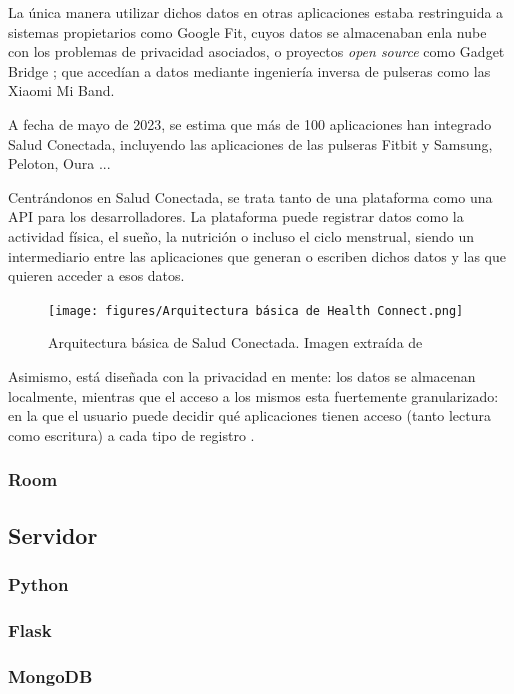             La única manera utilizar dichos datos 
            en otras aplicaciones estaba restringuida a sistemas propietarios como Google Fit, cuyos datos se 
            almacenaban enla nube con los problemas de privacidad asociados, o proyectos \textit{open source} como 
            Gadget Bridge \cite{freeyourgadget_gadgetbridge_nodate}; que accedían a datos mediante ingeniería inversa 
            de pulseras como las Xiaomi Mi Band. \newline

            A fecha de mayo de 2023, se estima que más de 100 aplicaciones han integrado Salud Conectada, incluyendo
            las aplicaciones de las pulseras Fitbit y Samsung, Peloton, Oura \cite{malik_googles_2023}... \newline

            Centrándonos en Salud Conectada, se trata tanto de una plataforma como una API para los desarrolladores.
            La plataforma puede registrar datos como la actividad física, el sueño, la nutrición o incluso el ciclo
            menstrual, siendo un intermediario entre las aplicaciones que generan o escriben dichos datos y las 
            que quieren acceder a esos datos. \newline

            \begin{figure}[h]
                \centering
                \texttt{[image: figures/Arquitectura básica de Health Connect.png]}
                \caption[Arquitectura básica de Salud Conectada.]
                {Arquitectura básica de  Salud Conectada. Imagen extraída de \cite{wilk_introducing_2022}}
                \label{figure:health_connect:logo}
            \end{figure}
            
            Asimismo, está diseñada con la privacidad en mente: los datos se almacenan localmente, mientras que el 
            acceso a los mismos esta fuertemente granularizado: en la que el usuario puede
            decidir qué aplicaciones tienen acceso (tanto lectura como escritura) a cada tipo de registro 
            \cite{saez_google_2022}.

            

        \subsubsection{Room}

    
    \subsection{Servidor}
        \subsubsection{Python}

        \subsubsection{Flask}

        \subsubsection{MongoDB}
